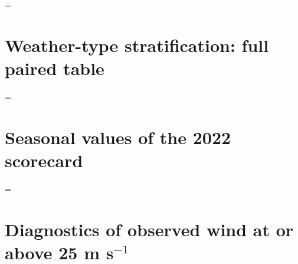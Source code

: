 \documentclass[12pt]{article}
\newcommand{\fitTable}[1]{\begingroup\linespread{1}\selectfont\setbox0=\hbox{#1}\ifdim\wd0>\linewidth\setbox0=\hbox{\resizebox{\linewidth}{!}{\box0}}\fi\ifdim\dimexpr\ht0+\dp0\relax>.68\textheight\resizebox*{!}{.68\textheight}{\box0}\else\box0\fi\endgroup}
\newcommand{\mps}{m s$^{-1}$}
\begin{document}
\begin{table}[h!]
\caption{RMSE of the $\lambda=0$ control of the linear-stacking experiment by variable and lead time (three-seed means), and the relative RMSE change (\%) of the three joint objectives at the same output stage; negative values are lower error. The safeguard changes U10 and V10 only.}
\label{tab:sixcost}
\vspace*{2mm}
\centering
{\linespread{1.0}\selectfont\footnotesize
\fitTable{}}
\end{table}

\clearpage
\section{Weather-type stratification: full paired table}

\begin{table}[h!]
\linespread{1}\selectfont
\caption{All paired comparisons of the weather-type stratification on the sealed 2022 sample (seed 123), with 95\% intervals from 2\,000 resamples of the stratum units. Tropical cyclones: 92 storm identifiers (81 with an event); cold surge and non-tropical high wind: 32 initialization dates. U10 RMSE and CRPS are computed on observed event cells; Brier scores are available only for the probabilistic outputs of PS-PaE-Fuse.}
\label{tab:wt}
\vspace*{2mm}
\centering
{\linespread{1.0}\selectfont\footnotesize
\fitTable{}}
\end{table}

\clearpage
\section{Seasonal values of the 2022 scorecard}

\begin{table}[h!]
\caption{Numerical values plotted in Fig.~2 of the main text: equal-lead scores over all 32 sealed 2022 dates and by season (7, 8, 8 and 9 dates in DJF, MAM, JJA and SON). PS-PaE-Fuse rows are three-seed means.}
\label{tab:seasonal}
\vspace*{2mm}
\centering
{\linespread{1.0}\selectfont\footnotesize
\fitTable{}}
\end{table}

\clearpage
\section{Diagnostics of observed wind at or above 25 \mps}
\end{document}
